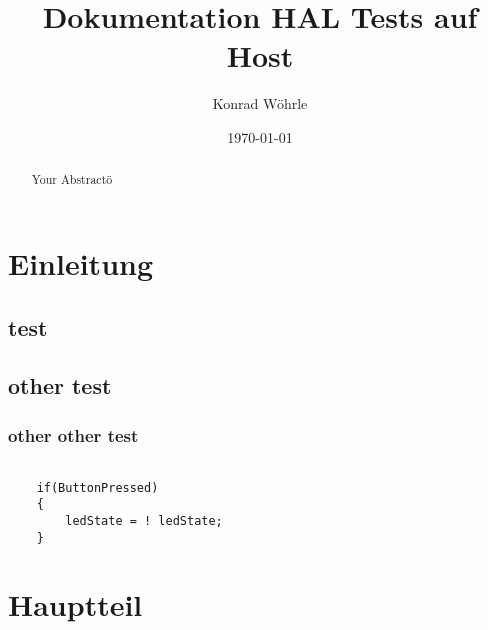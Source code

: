 \documentclass[12pt,a4paper]{article}
\title{Dokumentation HAL Tests auf Host}
\author{Konrad Wöhrle}
\date{\today}
\begin{document}
\maketitle
\tableofcontents
\newpage

\section{Einleitung}

\subsection{test}
\subsection{other test}
\subsubsection{other other test}
\empty
\begin{verbatim}

    if(ButtonPressed)
    {
        ledState = ! ledState;
    }

\end{verbatim}

\section{Hauptteil}
\section{}

\begin{abstract}
Your Abstractö
\end{abstract}
\end{document}
